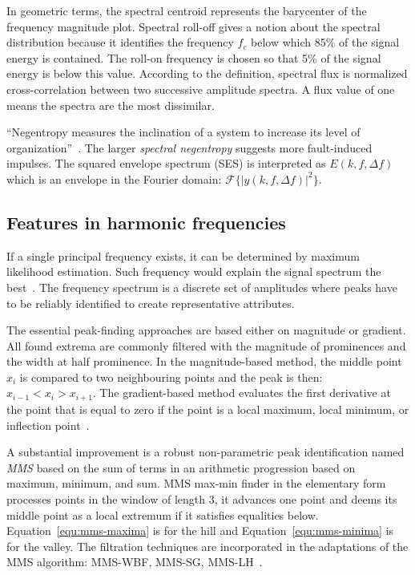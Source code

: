 In geometric terms, the spectral centroid represents the barycenter of the frequency magnitude plot. Spectral roll-off gives a notion about the spectral distribution because it identifies the frequency $f_c$ below which 85\% of the signal energy is contained. The roll-on frequency is chosen so that 5\% of the signal energy is below this value. According to the definition, spectral flux is normalized cross-correlation between two successive amplitude spectra. A flux value of one means the spectra are the most dissimilar.

``Negentropy measures the inclination of a system to increase its level of organization''~\cite{avoci_spectral_2020}. The larger \emph{spectral negentropy} suggests more fault-induced impulses. The squared envelope spectrum (SES) is interpreted as $E(k, f, \Delta f)$ which is an envelope in the Fourier domain: $\mathcal{F}\{ |y(k, f, \Delta f)|^2 \}$.

\subsection{Features in harmonic frequencies}
If a single principal frequency exists, it can be determined by maximum likelihood estimation. Such frequency would explain the signal spectrum the best~\cite{peeters_large_2004}. The frequency spectrum is a discrete set of amplitudes where peaks have to be reliably identified to create representative attributes.

The essential peak-finding approaches are based either on magnitude or gradient. All found extrema are commonly filtered with the magnitude of prominences and the width at half prominence. In the magnitude-based method, the middle point $x_i$ is compared to two neighbouring points and the peak is then: $x_{i-1} < x_i > x_{i+1}$. The gradient-based method evaluates the first derivative at the point that is equal to zero if the point is a local maximum, local minimum, or inflection point~\cite{adikaram_non-parametric_2016}.

A substantial improvement is a robust non-parametric peak identification named \emph{MMS} based on the sum of terms in an arithmetic progression based on maximum, minimum, and sum. MMS max-min finder in the elementary form processes points in the window of length 3, it advances one point and deems its middle point as a local extremum if it satisfies equalities below. Equation~\ref{equ:mms-maxima} is for the hill and Equation~\ref{equ:mms-minima} is for the valley. The filtration techniques are incorporated in the adaptations of the MMS algorithm: MMS-WBF, MMS-SG, MMS-LH~\cite{adikaram_non-parametric_2016}.

